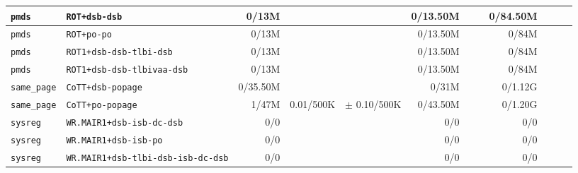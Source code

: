 \begin{tabular}{l l  | r r l | r r l | r r l l}
           \verb|pmds| &                                          \verb|ROT+dsb-dsb| &          0/13M &                       &                   &       0/13.50M &                       &                   &       0/84.50M &                       &                    & \\ \hline 
           \verb|pmds| &                                            \verb|ROT+po-po| &          0/13M &                       &                   &       0/13.50M &                       &                   &          0/84M &                       &                    & \\ \hline 
           \verb|pmds| &                                \verb|ROT1+dsb-dsb-tlbi-dsb| &          0/13M &                       &                   &       0/13.50M &                       &                   &          0/84M &                       &                    & \\ \hline 
           \verb|pmds| &                             \verb|ROT1+dsb-dsb-tlbivaa-dsb| &          0/13M &                       &                   &       0/13.50M &                       &                   &          0/84M &                       &                    & \\ \hline 
      \verb|same_page| &                                      \verb|CoTT+dsb-popage| &       0/35.50M &                       &                   &          0/31M &                       &                   &        0/1.12G &                       &                    & \\ \hline 
      \verb|same_page| &                                       \verb|CoTT+po-popage| &          1/47M &             0.01/500K &   $\pm$ 0.10/500K &       0/43.50M &                       &                   &        0/1.20G &                       &                    & \\ \hline 
         \verb|sysreg| &                              \verb|WR.MAIR1+dsb-isb-dc-dsb| &            0/0 &                       &                   &            0/0 &                       &                   &            0/0 &                       &                    & \\ \hline 
         \verb|sysreg| &                                  \verb|WR.MAIR1+dsb-isb-po| &            0/0 &                       &                   &            0/0 &                       &                   &            0/0 &                       &                    & \\ \hline 
         \verb|sysreg| &                     \verb|WR.MAIR1+dsb-tlbi-dsb-isb-dc-dsb| &            0/0 &                       &                   &            0/0 &                       &                   &            0/0 &                       &                    & \\ \hline 

\end{tabular}
